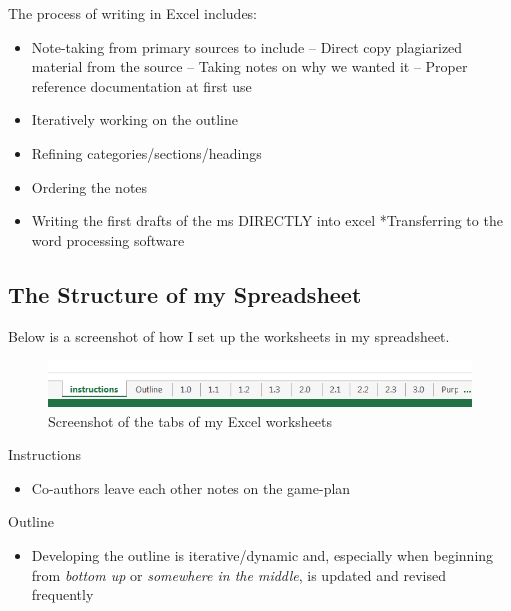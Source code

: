 \documentclass[
  english,
]{book}
\providecommand{\tightlist}{%
  \setlength{\itemsep}{0pt}\setlength{\parskip}{0pt}}
\begin{document}
The process of writing in Excel includes:

\begin{itemize}
\tightlist
\item
  Note-taking from primary sources to include
  -- Direct copy plagiarized material from the source
  -- Taking notes on why we wanted it
  -- Proper reference documentation at first use
\item
  Iteratively working on the outline
\item
  Refining categories/sections/headings
\item
  Ordering the notes
\item
  Writing the first drafts of the ms DIRECTLY into excel
  *Transferring to the word processing software
\end{itemize}

\hypertarget{the-structure-of-my-spreadsheet}{%
\subsection{The Structure of my Spreadsheet}\label{the-structure-of-my-spreadsheet}}

Below is a screenshot of how I set up the worksheets in my spreadsheet.

\begin{figure}
\centering
\includegraphics{images/Excel/Worksheets.png}
\caption{Screenshot of the tabs of my Excel worksheets}
\end{figure}

Instructions

\begin{itemize}
\tightlist
\item
  Co-authors leave each other notes on the game-plan
\end{itemize}

Outline

\begin{itemize}
\tightlist
\item
  Developing the outline is iterative/dynamic and, especially when beginning from \emph{bottom up} or \emph{somewhere in the middle}, is updated and revised frequently
\end{itemize}
\end{document}
